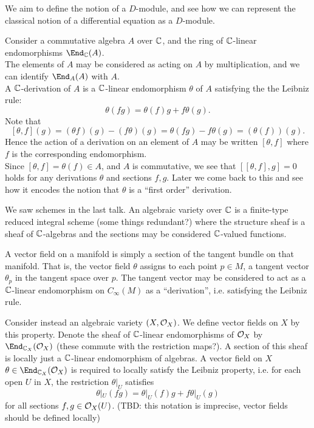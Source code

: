 \documentclass[a4paper]{article}
\begin{document}
\maketitle
We aim to define the notion of a $D$-module, and see how we can represent the classical notion of a differential equation as a $D$-module.

Consider a commutative algebra $A$ over $\mathbb{C}$, and the ring of $\mathbb{C}$-linear endomorphisms $\End_\bC(A)$.\\

The elements of $A$ may be considered as acting on $A$ by multiplication, and we can identify $\End_A(A)$ with $A$.\\

A $\mathbb{C}$-derivation of $A$ is a $\mathbb{C}$-linear endomorphism $\theta$ of $A$ satisfying the the Leibniz rule:
\[
    \theta(fg) = \theta(f)g + f\theta(g).
\]
Note that
\[
    [\theta,f](g) = (\theta f)(g) - (f\theta)(g) = \theta(fg) - f\theta(g) = (\theta(f))(g).
\]
Hence the action of a derivation on an element of $A$ may be written $[\theta, f]$ where $f$ is the corresponding endomorphism.\\
Since $[\theta, f] = \theta(f) \in A$, and $A$ is commutative, we see that $[[\theta,f ], g] = 0$ holds for any derivations $\theta$ and sections $f,g$. Later we come back to this and see how it encodes the notion that $\theta$ is a ``first order'' derivation.

We saw schemes in the last talk. An algebraic variety over $\mathbb{C}$ is a finite-type reduced integral scheme (some things redundant?) where the structure sheaf is a sheaf of $\mathbb{C}$-algebras and the sections may be considered $\mathbb{C}$-valued functions.


A vector field on a manifold is simply a section of the tangent bundle on that manifold. That is, the vector field $\theta$ assigns to each point $p\in M$, a tangent vector $\theta_p$ in the tangent space over $p$. The tangent vector may be considered to act as a $\mathbb{C}$-linear endomorphism on $C_\infty(M)$ as a ``derivation'', i.e. satisfying the Leibniz rule.

Consider instead an algebraic variety $(X, \mathcal{O}_X)$. We define vector fields on $X$ by this property. Denote the sheaf of $\mathbb{C}$-linear endomorphisms of $\mathcal{O}_X$ by $\End_{\bC_X}(\cO_X)$ (these commute with the restriction maps?). A section of this sheaf is locally just a $\mathbb{C}$-linear endomorphism of algebras. A vector field on $X$ $\theta \in \End_{\bC_X}(\cO_X)$ is required to locally satisfy the Leibniz property, i.e. for each open $U$ in $X$, the restriction $\theta|_U$ satisfies
\[
    \theta|_U(fg) =\theta|_U(f) g + f \theta|_U(g)
\]
for all sections $f,g \in \mathcal{O}_X(U)$.
(TBD: this notation is imprecise, vector fields should be defined locally)
\end{document}
